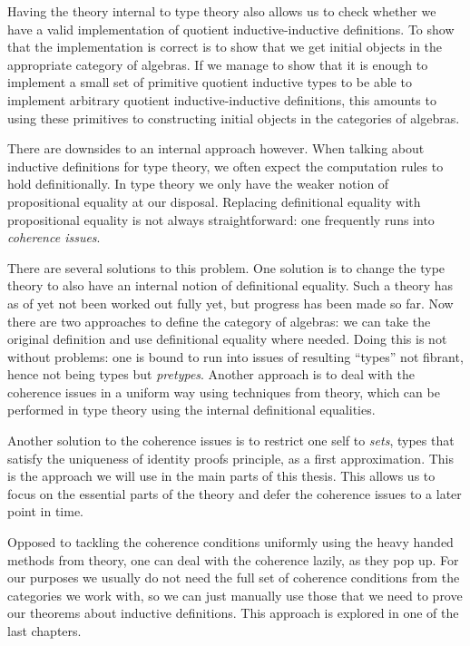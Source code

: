 Having the theory internal to type theory also allows us to check
whether we have a valid implementation of quotient inductive-inductive
definitions. To show that the implementation is correct is to show
that we get initial objects in the appropriate category of
algebras. If we manage to show that it is enough to implement a small
set of primitive quotient inductive types to be able to implement
arbitrary quotient inductive-inductive definitions, this amounts to
using these primitives to constructing initial objects in the
categories of algebras.

There are downsides to an internal approach however. When talking
about inductive definitions for type theory, we often expect the
computation rules to hold definitionally. In type theory we only have
the weaker notion of propositional equality at our disposal. Replacing
definitional equality with propositional equality is not always
straightforward: one frequently runs into \emph{coherence
  issues}.

There are several solutions to this problem. One solution is to change
the type theory to also have an internal notion of definitional
equality. Such a theory has as of yet not been worked out fully yet,
but progress has been made so far. Now there are two approaches to
define the category of algebras: we can take the original definition
and use definitional equality where needed. Doing this is not without
problems: one is bound to run into issues of resulting ``types'' not
fibrant, hence not being types but \emph{pretypes}. Another approach
is to deal with the coherence issues in a uniform way using techniques
from \inftycat theory, which can be performed in type theory using the
internal definitional equalities.

Another solution to the coherence issues is to restrict one self to
\emph{sets}, \ie types that satisfy the uniqueness of identity proofs
principle, as a first approximation. This is the approach we will use
in the main parts of this thesis. This allows us to focus on the
essential parts of the theory and defer the coherence issues to a
later point in time.

Opposed to tackling the coherence conditions uniformly using the heavy
handed methods from \inftycat theory, one can deal with the coherence
lazily, \ie as they pop up. For our purposes we usually do not need
the full set of coherence conditions from the categories we work with,
so we can just manually use those that we need to prove our theorems
about inductive definitions. This approach is explored in one of the
last chapters.

